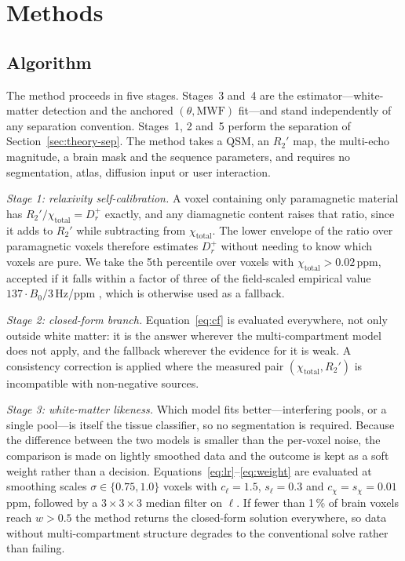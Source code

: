 \documentclass[AMA,STIX2COL,Linenumberson]{MRM}
\begin{document}
\section{Methods}

\subsection{Algorithm}

The method proceeds in five stages. Stages~3 and~4 are the estimator---white-matter detection and the anchored $(\theta,\mathrm{MWF})$ fit---and stand independently of any separation convention. Stages~1, 2 and~5 perform the separation of Section~\ref{sec:theory-sep}. The method takes a QSM, an $R_2'$ map, the multi-echo magnitude, a brain mask and the sequence parameters, and requires no segmentation, atlas, diffusion input or user interaction.

\emph{Stage 1: relaxivity self-calibration.} A voxel containing only paramagnetic material has $R_2'/\chi_{\mathrm{total}} = D_r^{+}$ exactly, and any diamagnetic content raises that ratio, since it adds to $R_2'$ while subtracting from $\chi_{\mathrm{total}}$. The lower envelope of the ratio over paramagnetic voxels therefore estimates $D_r^{+}$ without needing to know which voxels are pure. We take the 5th percentile over voxels with $\chi_{\mathrm{total}}>0.02$\,ppm, accepted if it falls within a factor of three of the field-scaled empirical value $137\cdot B_0/3$\,Hz/ppm \cite{shin_chiseparation_2021}, which is otherwise used as a fallback.

\emph{Stage 2: closed-form branch.} Equation~\eqref{eq:cf} is evaluated everywhere, not only outside white matter: it is the answer wherever the multi-compartment model does not apply, and the fallback wherever the evidence for it is weak. A consistency correction is applied where the measured pair $(\chi_{\mathrm{total}},R_2')$ is incompatible with non-negative sources.

\emph{Stage 3: white-matter likeness.} Which model fits better---interfering pools, or a single pool---is itself the tissue classifier, so no segmentation is required. Because the difference between the two models is smaller than the per-voxel noise, the comparison is made on lightly smoothed data and the outcome is kept as a soft weight rather than a decision. Equations~\eqref{eq:lr}--\eqref{eq:weight} are evaluated at smoothing scales $\sigma\in\{0.75,1.0\}$ voxels with $c_\ell=1.5$, $s_\ell=0.3$ and $c_\chi=s_\chi=0.01$\,ppm, followed by a $3\times3\times3$ median filter on $\ell$. If fewer than 1\,\% of brain voxels reach $w>0.5$ the method returns the closed-form solution everywhere, so data without multi-compartment structure degrades to the conventional solve rather than failing.
\end{document}
